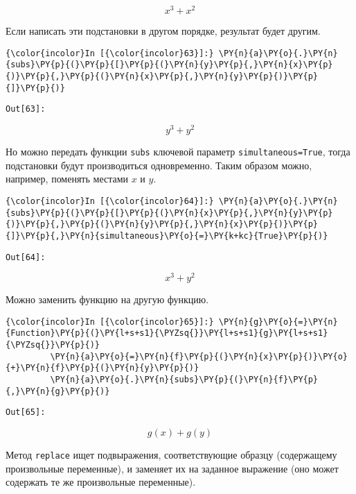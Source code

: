     \[x^{3} + x^{2}\]

    

    Если написать эти подстановки в другом порядке, результат будет другим.

    \begin{Verbatim}[commandchars=\\\{\}]
{\color{incolor}In [{\color{incolor}63}]:} \PY{n}{a}\PY{o}{.}\PY{n}{subs}\PY{p}{(}\PY{p}{[}\PY{p}{(}\PY{n}{y}\PY{p}{,}\PY{n}{x}\PY{p}{)}\PY{p}{,}\PY{p}{(}\PY{n}{x}\PY{p}{,}\PY{n}{y}\PY{p}{)}\PY{p}{]}\PY{p}{)}
\end{Verbatim}
\texttt{\color{outcolor}Out[{\color{outcolor}63}]:}
    
    \[y^{3} + y^{2}\]

    

    Но можно передать функции \texttt{subs} ключевой параметр
\texttt{simultaneous=True}, тогда подстановки будут производиться
одновременно. Таким образом можно, например, поменять местами \(x\) и
\(y\).

    \begin{Verbatim}[commandchars=\\\{\}]
{\color{incolor}In [{\color{incolor}64}]:} \PY{n}{a}\PY{o}{.}\PY{n}{subs}\PY{p}{(}\PY{p}{[}\PY{p}{(}\PY{n}{x}\PY{p}{,}\PY{n}{y}\PY{p}{)}\PY{p}{,}\PY{p}{(}\PY{n}{y}\PY{p}{,}\PY{n}{x}\PY{p}{)}\PY{p}{]}\PY{p}{,}\PY{n}{simultaneous}\PY{o}{=}\PY{k+kc}{True}\PY{p}{)}
\end{Verbatim}
\texttt{\color{outcolor}Out[{\color{outcolor}64}]:}
    
    \[x^{3} + y^{2}\]

    

    Можно заменить функцию на другую функцию.

    \begin{Verbatim}[commandchars=\\\{\}]
{\color{incolor}In [{\color{incolor}65}]:} \PY{n}{g}\PY{o}{=}\PY{n}{Function}\PY{p}{(}\PY{l+s+s1}{\PYZsq{}}\PY{l+s+s1}{g}\PY{l+s+s1}{\PYZsq{}}\PY{p}{)}
         \PY{n}{a}\PY{o}{=}\PY{n}{f}\PY{p}{(}\PY{n}{x}\PY{p}{)}\PY{o}{+}\PY{n}{f}\PY{p}{(}\PY{n}{y}\PY{p}{)}
         \PY{n}{a}\PY{o}{.}\PY{n}{subs}\PY{p}{(}\PY{n}{f}\PY{p}{,}\PY{n}{g}\PY{p}{)}
\end{Verbatim}
\texttt{\color{outcolor}Out[{\color{outcolor}65}]:}
    
    \[g{\left (x \right )} + g{\left (y \right )}\]

    

    Метод \texttt{replace} ищет подвыражения, соответствующие образцу
(содержащему произвольные переменные), и заменяет их на заданное
выражение (оно может содержать те же произвольные переменные).

